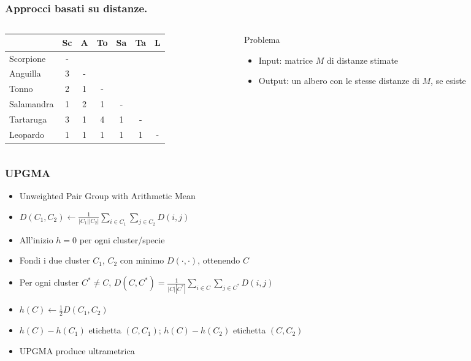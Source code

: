 \begin{frame}
\frametitle{Approcci basati su distanze.}
\begin{columns}
  \begin{column}{0.48\textwidth}
{    \scriptsize
 \begin{tabular}{l|cccccc}
        & Sc & A & To & Sa & Ta & L\\ \hline
        Scorpione& - & & & & &\\
        Anguilla& 3 & - & & & &\\
        Tonno& 2 & 1 & - &  & &\\
        Salamandra& 1 & 2 & 1 & - & &\\
        Tartaruga& 3 & 1 & 4 & 1 & -&\\
        Leopardo& 1 & 1 & 1 & 1 & 1 & -
 \end{tabular}
}
\end{column}
  \begin{column}{0.48\textwidth}
\begin{block}{Problema}
  \begin{itemize}
    \item
  Input: matrice $M$ di distanze stimate
    \item
      Output: un albero con le stesse distanze di $M$, se esiste
\end{itemize}
\end{block}
\end{column}
\end{columns}
\end{frame}

\begin{frame}[fragile]
  \frametitle{UPGMA}
\begin{itemize}
\item
  Unweighted Pair Group with Arithmetic Mean
\item
  $D(C_{1}, C_{2}) \gets \frac{1}{|C_{1}||C_{2}|}\sum_{i\in C_{1}}\sum_{j\in C_{2}} D(i,j)$
\item
  All'inizio $h=0$ per ogni cluster/specie
\item
Fondi i due cluster $C_{1}$, $C_{2}$ con minimo $D(\cdot, \cdot)$, ottenendo $C$
\item
  Per ogni cluster $C^{*}\neq C$, $D(C, C^{*}) = \frac{1}{|C||C^{*}|}\sum_{i\in C}\sum_{j\in C^{*}} D(i,j)$
\item
  $h(C)\gets \frac{1}{2}D(C_{1}, C_{2})$
\item
  $h(C) - h(C_{1})$ etichetta $(C, C_{1})$; $h(C) - h(C_{2})$ etichetta $(C, C_{2})$
\item
  UPGMA produce ultrametrica
\end{itemize}
\end{frame}

